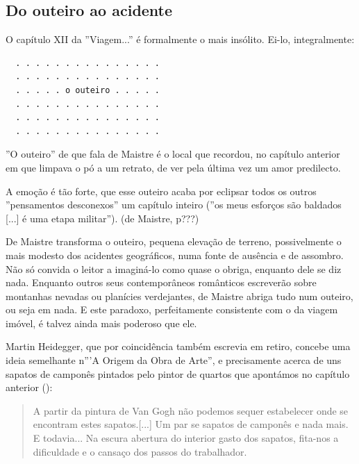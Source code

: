 \documentclass[12pt]{article}
\newenvironment{citacao}
{\begin{quote}
    \begin{small}
      \itshape
      \linespread{1}
}
{\end{small}\end{quote}}
\begin{document}
\subsection{Do outeiro ao acidente}

O capítulo XII da ''Viagem...'' é formalmente o mais insólito. Ei-lo,
integralmente:

\begin{center}
\begin{verbatim}
  . . . . . . . . . . . . . . .
  . . . . . . . . . . . . . . .
  . . . . . o outeiro . . . . .
  . . . . . . . . . . . . . . .
  . . . . . . . . . . . . . . .
  . . . . . . . . . . . . . . .
\end{verbatim}
\end{center}

''O outeiro'' de que fala de Maistre é o local que recordou, no
capítulo anterior em que limpava o pó a um retrato, de ver pela última
vez um amor predilecto.

A emoção é tão forte, que esse outeiro acaba por eclipsar todos os
outros ''pensamentos desconexos'' um capítulo inteiro (''os meus
esforços são baldados [...] é uma etapa militar''). (de Maistre, p???)

De Maistre transforma o outeiro, pequena elevação de terreno,
possivelmente o mais modesto dos acidentes geográficos, numa fonte de
ausência e de assombro. Não só convida o leitor a imaginá-lo como
quase o obriga, enquanto dele se diz nada. Enquanto outros seus
contemporâneos românticos escreverão sobre montanhas nevadas ou
planícies verdejantes, de Maistre abriga tudo num outeiro, ou seja em
nada. E este paradoxo, perfeitamente consistente com o da viagem
imóvel, é talvez ainda mais poderoso que ele.

Martin Heidegger, que por coincidência também escrevia em retiro,
concebe uma ideia semelhante n'''A Origem da Obra de Arte'', e
precisamente acerca de uns sapatos de camponês pintados pelo pintor de
quartos que apontámos no capítulo anterior (\cite[p.24]{heidegger}):

\singlespacing

\begin{citacao}
  A partir da pintura de Van Gogh não podemos sequer estabelecer onde
  se encontram estes sapatos.[...] Um par se sapatos de camponês e
  nada mais. E todavia...  Na escura abertura do interior gasto dos
  sapatos, fita-nos a dificuldade e o cansaço dos passos do
  trabalhador.
\end{citacao}
\end{document}
